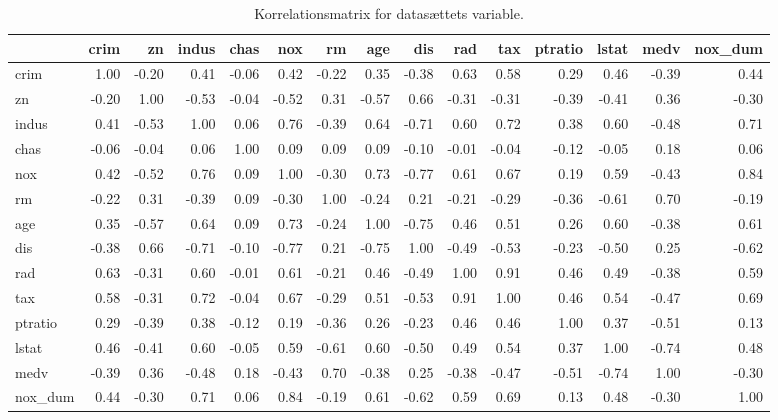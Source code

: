 \begin{table}
\caption{Korrelationsmatrix for datasættets variable.}
\label{tab:corr_matrix}
\begin{tabular}{lrrrrrrrrrrrrrr}
\toprule
 & crim & zn & indus & chas & nox & rm & age & dis & rad & tax & ptratio & lstat & medv & nox_dum \\
\midrule
crim & 1.00 & -0.20 & 0.41 & -0.06 & 0.42 & -0.22 & 0.35 & -0.38 & 0.63 & 0.58 & 0.29 & 0.46 & -0.39 & 0.44 \\
zn & -0.20 & 1.00 & -0.53 & -0.04 & -0.52 & 0.31 & -0.57 & 0.66 & -0.31 & -0.31 & -0.39 & -0.41 & 0.36 & -0.30 \\
indus & 0.41 & -0.53 & 1.00 & 0.06 & 0.76 & -0.39 & 0.64 & -0.71 & 0.60 & 0.72 & 0.38 & 0.60 & -0.48 & 0.71 \\
chas & -0.06 & -0.04 & 0.06 & 1.00 & 0.09 & 0.09 & 0.09 & -0.10 & -0.01 & -0.04 & -0.12 & -0.05 & 0.18 & 0.06 \\
nox & 0.42 & -0.52 & 0.76 & 0.09 & 1.00 & -0.30 & 0.73 & -0.77 & 0.61 & 0.67 & 0.19 & 0.59 & -0.43 & 0.84 \\
rm & -0.22 & 0.31 & -0.39 & 0.09 & -0.30 & 1.00 & -0.24 & 0.21 & -0.21 & -0.29 & -0.36 & -0.61 & 0.70 & -0.19 \\
age & 0.35 & -0.57 & 0.64 & 0.09 & 0.73 & -0.24 & 1.00 & -0.75 & 0.46 & 0.51 & 0.26 & 0.60 & -0.38 & 0.61 \\
dis & -0.38 & 0.66 & -0.71 & -0.10 & -0.77 & 0.21 & -0.75 & 1.00 & -0.49 & -0.53 & -0.23 & -0.50 & 0.25 & -0.62 \\
rad & 0.63 & -0.31 & 0.60 & -0.01 & 0.61 & -0.21 & 0.46 & -0.49 & 1.00 & 0.91 & 0.46 & 0.49 & -0.38 & 0.59 \\
tax & 0.58 & -0.31 & 0.72 & -0.04 & 0.67 & -0.29 & 0.51 & -0.53 & 0.91 & 1.00 & 0.46 & 0.54 & -0.47 & 0.69 \\
ptratio & 0.29 & -0.39 & 0.38 & -0.12 & 0.19 & -0.36 & 0.26 & -0.23 & 0.46 & 0.46 & 1.00 & 0.37 & -0.51 & 0.13 \\
lstat & 0.46 & -0.41 & 0.60 & -0.05 & 0.59 & -0.61 & 0.60 & -0.50 & 0.49 & 0.54 & 0.37 & 1.00 & -0.74 & 0.48 \\
medv & -0.39 & 0.36 & -0.48 & 0.18 & -0.43 & 0.70 & -0.38 & 0.25 & -0.38 & -0.47 & -0.51 & -0.74 & 1.00 & -0.30 \\
nox_dum & 0.44 & -0.30 & 0.71 & 0.06 & 0.84 & -0.19 & 0.61 & -0.62 & 0.59 & 0.69 & 0.13 & 0.48 & -0.30 & 1.00 \\
\bottomrule
\end{tabular}
\end{table}
